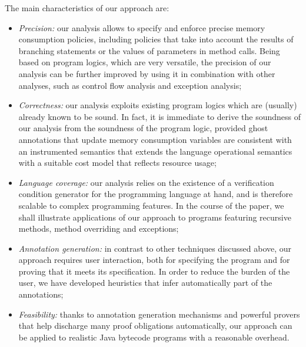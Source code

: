 The main characteristics of our approach are:
\begin{itemize}
\item \emph{Precision:} our analysis allows to specify and enforce
precise memory consumption policies, including policies that take
into account the results of branching statements or the values of
parameters in method calls. Being based on program logics, which are
very versatile, the precision of our analysis can be further improved
by using it in combination with other analyses, such as control flow
analysis and exception analysis;


\item \emph{Correctness:} our analysis exploits existing program logics
which are (usually) already known to be sound. In fact, it is immediate
to derive the soundness of our analysis from the soundness of the program
logic, provided ghost annotations that update memory consumption variables
are consistent with an instrumented semantics that  extends the language
operational semantics with a suitable cost model that reflects resource
usage;

\item \emph{Language coverage:} our analysis relies on the existence
of a verification condition generator for the programming language at
hand, and is therefore scalable to complex programming features.  In
the course of the paper, we shall illustrate applications of our
approach to programs featuring recursive methods, method
overriding and exceptions;





\item \emph{Annotation generation:} in contrast to other techniques
discussed above, our approach requires user interaction, both for
specifying the program and for proving that it meets its specification.
In order to reduce the burden of the user, we have developed heuristics
that infer automatically part of the annotations;


\item \emph{Feasibility:} thanks to annotation generation mechanisms
and powerful provers that help discharge many proof obligations
automatically, our approach can be applied to realistic Java bytecode
programs with a reasonable overhead.
\end{itemize}
